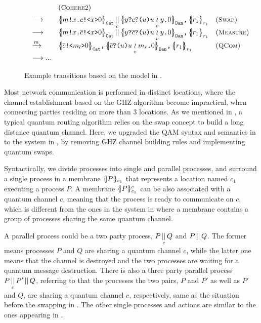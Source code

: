 \begin{figure}[t]
{\[\begin{array}{l}
\begin{array}{lll}
&
(\rulelab{Cohere2})
\\[0.5em]
\longrightarrow
&
\pard{\parll{\qcellb{\send{m}{x}{\csend{c}{x}{0}}}{\cn{Cat}}}{c}
{\qcellb{\rev{y}{\crev{c}{u}{\mer{u}{v}{y}{0}}}}{\cn{Dan}}}}
{\qcellb{r_1}{r_1}}
&
(\rulelab{Swap})
\\[0.5em]
\longrightarrow
&
\pard{\parl{\qcellb{\send{m}{x}{\csend{\overline{c}}{x}{0}}}{\cn{Cat}}}
{\qcellb{\rev{y}{\crev{\overline{c}}{u}{\mer{u}{v}{y}{0}}}}{\cn{Dan}}}}
{\qcellb{r_1}{r_1}}
&
(\rulelab{Measure})
\\[0.5em]
\xrightarrow{m}
&
\pard{\pard{\qcellb{\csend{\overline{c}}{m_l}{0}}{\cn{Cat}}}
{\qcellb{\crev{\overline{c}}{u}{\mer{u}{v}{m_r}{0}}}{\cn{Dan}}}}
{\qcellb{r_1}{r_1}}
&
(\rulelab{QCom})
\\[0.5em]
\longrightarrow...
\end{array}
\end{array}
\]
}
\caption{Example transitions based on the model in .}
  \label{fig:q-pi-example}
\end{figure}

Most network communication is performed in distinct locations,
where the channel establishment based on the GHZ algorithm become impractical, when connecting parties residing on more than $3$ locations. As we mentioned in , a typical quantum routing algorithm relies on the swap concept to build a long distance quantum channel. Here, we upgraded the QAM syntax and semantics in  to the system in , by removing GHZ channel building rules and implementing quantum swaps.

Syntactically, we divide processes into single and parallel processes, and surround a single process in a membrane $\{\!| P |\!\}_{c_1}$ that represents a location named $c_1$ executing a process $P$. A membrane $\{\!| P |\!\}_{c_1}^c$ can be also associated with a quantum channel $c$, meaning that the process is ready to communicate on $c$, which is different from the ones in the system in  where a membrane contains a group of processes sharing the same quantum channel.

A parallel process could be a two party process, $P\,\underset{c}{||}\,Q$ and $P\,||\,Q$.
The former means processes $P$ and $Q$ are sharing a quantum channel $c$, while the latter one means that the channel is destroyed and the two processes are waiting for a quantum message destruction.
There is also a three party parallel process $P\,\underset{c}{||}\,P'\,||\,Q$, referring to that the processes the two pairs, $P$ and $P'$ as well as $P'$ and $Q$, are sharing a quantum channel $c$, respectively, same as the situation before the swapping in . The other single processes and actions are similar to the ones appearing in .

